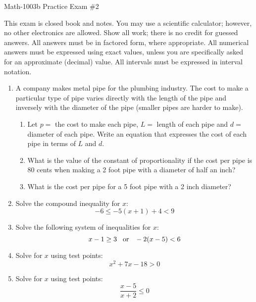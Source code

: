 \documentclass[letterpaper,12pt,fleqn]{article}
\begin{document}
\begin{center}
\Large Math-1003b Practice Exam \#2
\end{center}

\vspace{0.5in}

This exam is closed book and notes. You may use a scientific calculator; however, no
other electronics are allowed. Show all work; there is no credit for guessed answers. All
answers must be in factored form, where appropriate. All numerical answers must be
expressed using exact values, unless you are specifically asked for an approximate
(decimal) value. All intervals must be expressed in interval notation.

\vspace{0.25in}

\begin{enumerate}
\item A company makes metal pipe for the plumbing industry. The cost to make a particular
  type of pipe varies directly with the length of the pipe and inversely with the
  diameter of the pipe (smaller pipes are harder to make).
  \begin{enumerate}
  \item Let $p=$ the cost to make each pipe, $L=$ length of each pipe and $d=$ diameter of
    each pipe. Write an equation that expresses the cost of each pipe in terms of $L$
    and $d$.

  \item What is the value of the constant of proportionality if the cost per pipe is
    80 cents when making a 2 foot pipe with a diameter of half an inch?

  \item What is the cost per pipe for a 5 foot pipe with a 2 inch diameter?
  \end{enumerate}

\item Solve the compound inequality for $x$:
  \[-6\le-5(x+1)+4<9\]

\item Solve the following system of inequalities for $x$:
  \[x-1\ge3\hspace{2ex}\mbox{or}\hspace{2ex}-2(x-5)<6\]

\item Solve for $x$ using test points:
  \[x^2+7x-18>0\]

\item Solve for $x$ using test points:
  \[\frac{x-5}{x+2}\le0\]


\end{enumerate}
\end{document}
